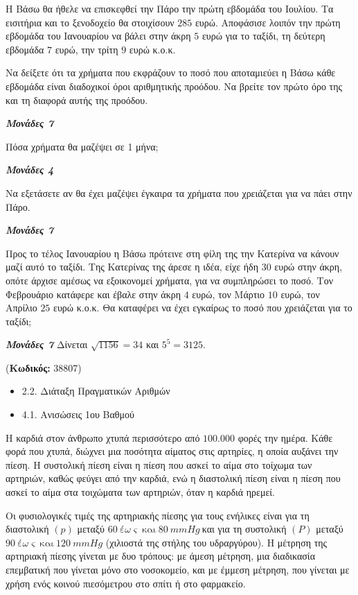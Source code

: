 \documentclass[11pt,a4paper,twoside]{book}
\newcounter{askhsh}[chapter]
\renewcommand{\theaskhsh}{
	\bf{\titlefont{\Large{\thechapter}}.\arabic{askhsh}}
}
\newcommand{\Askhsh}[2]{\refstepcounter{askhsh}{\titlefont{Άσκηση\theaskhsh} - \textcolor{maincolor}{ΘΕΜΑ #2}} ({\small{\textbf{Κωδικός:} #1}})\\}{}
\newenvironment{ylh}{
\begin{tcolorbox}[
breakable,
enhanced standard,
titlerule=0pt,
toprule=0pt, 
rightrule=0pt, 
bottomrule=0pt,
title={\titlefont Ύλη άσκησης},
colback=white,
opacityback=0,
left=2mm,
top=1mm,
bottom=0mm,
boxrule=0pt,
colframe=white,
borderline west={1.5mm}{0pt}{secondarycolor},
leftrule=2mm,
sharp corners,
coltitle=black
]
\begin{itemize}[leftmargin=3mm, itemsep=0mm, label=\textcolor{secondarycolor}{{\small\faBook}}]
}{
\end{itemize}
\end{tcolorbox}
}
\newcommand{\monades}[1]{
\hspace*{\fill}
\textbf{\textit{\textcolor{maincolor}{Μονάδες #1}}}}
\begin{document}
Η Βάσω θα ήθελε να επισκεφθεί την Πάρο την πρώτη εβδομάδα του Ιουλίου. Τα εισιτήρια και το ξενοδοχείο θα στοιχίσουν $285$ ευρώ. Αποφάσισε λοιπόν την πρώτη εβδομάδα του Ιανουαρίου να βάλει στην άκρη $5$ ευρώ για το ταξίδι, τη δεύτερη εβδομάδα $7$ ευρώ, την τρίτη $9$ ευρώ κ.ο.κ.

\begin{alist}
\item Να δείξετε ότι τα χρήματα που εκφράζουν το ποσό που αποταμιεύει η Βάσω κάθε εβδομάδα είναι διαδοχικοί όροι αριθμητικής προόδου. Να βρείτε τον πρώτο όρο της και τη διαφορά αυτής της προόδου.
\monades{7}
\item

\begin{rlist}
\item Πόσα χρήματα θα μαζέψει σε 1 μήνα;
\monades{4}
\item Να εξετάσετε αν θα έχει μαζέψει έγκαιρα τα χρήματα που χρειάζεται για να πάει στην Πάρο.
\monades{7}
\end{rlist}
\item Προς το τέλος Ιανουαρίου η Βάσω πρότεινε στη φίλη της την Κατερίνα να κάνουν μαζί αυτό το ταξίδι. Της Κατερίνας της άρεσε η ιδέα, είχε ήδη $30$ ευρώ στην άκρη, οπότε άρχισε αμέσως να εξοικονομεί χρήματα, για να συμπληρώσει το ποσό. Τον Φεβρουάριο κατάφερε και έβαλε στην άκρη $4$ ευρώ, τον Μάρτιο $10$ ευρώ, τον Απρίλιο $25$ ευρώ κ.ο.κ. Θα καταφέρει να έχει εγκαίρως το ποσό που χρειάζεται για το ταξίδι;
\monades{7}
Δίνεται $\sqrt{1156} = 34$ και $5^{5} = 3125$.
\end{alist}

\vspace{4mm}
\Askhsh{38807}{4}
\begin{ylh}
    \item 2.2. Διάταξη Πραγματικών Αριθμών
    \item 4.1. Ανισώσεις 1ου Βαθμού
\end{ylh}

Η καρδιά στον άνθρωπο χτυπά περισσότερο από $100.000$ φορές την ημέρα. Κάθε φορά που χτυπά, διώχνει μια ποσότητα αίματος στις αρτηρίες, η οποία αυξάνει την πίεση. Η συστολική πίεση είναι η πίεση που ασκεί το αίμα στο τοίχωμα των αρτηριών, καθώς φεύγει από την καρδιά, ενώ η διαστολική πίεση είναι η πίεση που ασκεί το αίμα στα τοιχώματα των αρτηριών, όταν η καρδιά ηρεμεί.

Οι φυσιολογικές τιμές της αρτηριακής πίεσης για τους ενήλικες είναι για τη διαστολική $(p)$ μεταξύ $60\ έ\omega\varsigma\ \text{και}\ 80\ mmHg\ $και για τη συστολική $(P)$ μεταξύ $90\ έ\omega\varsigma\ \text{και}\ 120\ mmHg$ (χιλιοστά της στήλης του υδραργύρου). Η μέτρηση της αρτηριακή πίεσης γίνεται με δυο τρόπους: με άμεση μέτρηση, μια διαδικασία επεμβατική που γίνεται μόνο στο νοσοκομείο, και με έμμεση μέτρηση, που γίνεται με χρήση ενός κοινού πιεσόμετρου στο σπίτι ή στο φαρμακείο.
\end{document}
